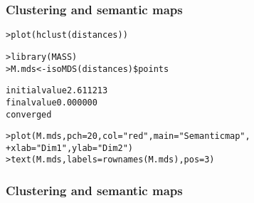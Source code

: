 \begin{frame}[fragile]
  \frametitle{Clustering and semantic maps}

\ungap
\begin{alltt}\small
{}
> plot(hclust(distances))

> library(MASS)
> M.mds <- isoMDS(distances)\$points \begin{Rout}
initial  value 2.611213 
final  value 0.000000 
converged \end{Rout}

> plot(M.mds, pch=20, col="red", main="Semantic map", 
+             xlab="Dim 1", ylab="Dim 2")
> text(M.mds, labels=rownames(M.mds), pos=3)
\end{alltt}
\end{frame}

\begin{frame}[c]
  \frametitle{Clustering and semantic maps}

\end{frame}

